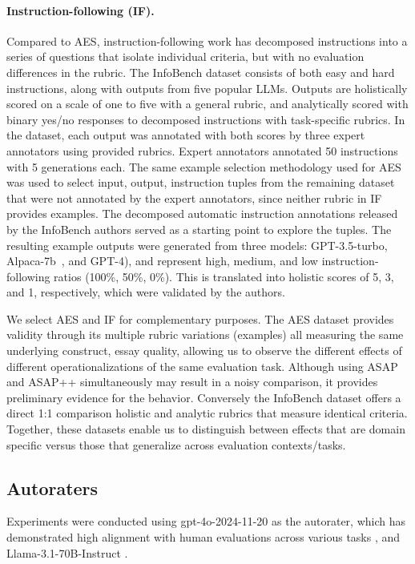 \paragraph{Instruction-following (IF).} 
Compared to AES, 
instruction-following work has decomposed instructions into a series of questions that isolate individual criteria, but with no evaluation differences in the rubric. The InfoBench \citep{qin-etal-2024-infobench} dataset consists of both easy and hard instructions, along with outputs from five popular LLMs. Outputs are holistically scored on a scale of one to five with a general rubric, and analytically scored with binary yes/no responses to decomposed instructions with task-specific rubrics. In the dataset, each output was annotated with both scores by three expert annotators using provided rubrics. Expert annotators annotated 50 instructions with 5 generations each. The same example selection methodology used for AES was used to select input, output, instruction tuples from the remaining dataset that were not annotated by the expert annotators, since neither rubric in IF provides examples. The decomposed automatic instruction annotations released by the InfoBench authors served as a starting point to explore the tuples. The resulting example outputs were generated from three models: GPT-3.5-turbo, Alpaca-7b~\citep{taori2023alpaca}, and GPT-4\citep{openai2024gpt4technicalreport}), and represent high, medium, and low instruction-following ratios (100\%, 50\%, 0\%). This is translated into holistic scores of 5, 3, and 1, respectively, which were validated by the authors.

We select AES and IF for complementary purposes. The AES dataset provides validity through its multiple rubric variations (examples) all measuring the same underlying construct, essay quality, allowing us to observe the different effects of different operationalizations of the same evaluation task. Although using ASAP and ASAP++ simultaneously may result in a noisy comparison, it provides preliminary evidence for the behavior. Conversely the InfoBench dataset offers a direct 1:1 comparison holistic and analytic rubrics that measure identical criteria. Together, these datasets enable us to distinguish between effects that are domain specific versus those that generalize across evaluation contexts/tasks.

\subsection{Autoraters}
Experiments were conducted using gpt-4o-2024-11-20\citep{openai2024gpt4ocard} as the autorater, which has demonstrated high alignment with human evaluations across various tasks \citep{chan:chateval, zhou:sotopia}, and Llama-3.1-70B-Instruct \citep{grattafiori2024llama}. 

